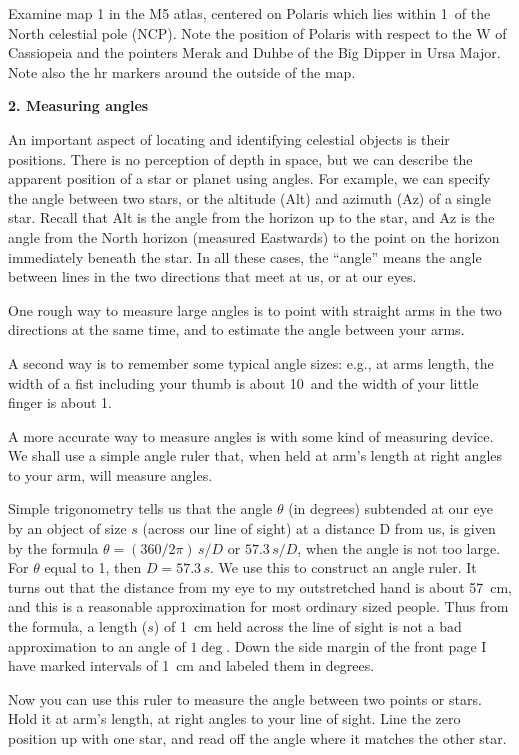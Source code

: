 \documentclass[12pt]{article}
\begin{document}
Examine map 1 in the M5 atlas, centered on Polaris which lies within
1\deg\ of the North celestial pole (NCP). Note the position of Polaris
with respect to the W of Cassiopeia and the pointers Merak and Duhbe
of the Big Dipper in Ursa Major. Note also the hr markers around the
outside of the map.

\bigskip
\noindent
{\bf 2. Measuring angles}

\medskip
\noindent
An important aspect of locating and
identifying celestial objects is their positions. There is no
perception of depth in space, but we can describe the apparent
position of a star or planet using angles. For example, we can specify
the angle between two stars, or the altitude (Alt) and azimuth (Az) of
a single star. Recall that Alt is the angle from the horizon up to the
star, and Az is the angle from the North horizon (measured Eastwards)
to the point on the horizon immediately beneath the star. In all these
cases, the ``angle'' means the angle between lines in the two
directions that meet at us, or at our eyes.

One rough way to measure large angles is to point with straight arms
in the two directions at the same time, and to estimate the angle
between your arms.

A second way is to remember some typical angle sizes: e.g.,  at
arms length, the width of a fist including your thumb is about 10\deg\
and the width of your little finger is about 1\deg.

A more accurate way to measure angles is with some kind of measuring
device. We shall use a simple angle ruler that, when held at arm's
length at right angles to your arm, will measure angles.

Simple trigonometry tells us that the angle $\theta$ (in degrees)
subtended at our eye by an object of size $s$ (across our line of
sight) at a distance D from us, is given by the formula $\theta =
(360/2\pi)\,s/D$ or $57.3\, s/D$, when the angle is not too large.
For $\theta$ equal to 1\deg, then $D = 57.3\, s$.  We use this to
construct an angle ruler.  It turns out that the distance from my eye
to my outstretched hand is about 57~cm, and this is a reasonable approximation
for most ordinary sized people. Thus from the formula, a length ($s$) of
1~cm held across the line of sight is not a bad approximation to an
angle of $1\deg$.  Down the side margin of the front page I have
marked intervals of 1~cm and labeled them in degrees.

Now you can use this ruler to measure the angle between two points or
stars. Hold it at arm's length, at right angles to your line of
sight. Line the zero position up with one star, and read off the angle
where it matches the other star.
\end{document}
